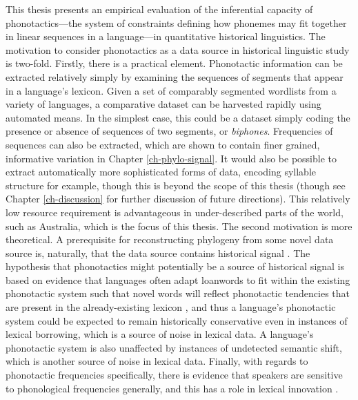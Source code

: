This thesis presents an empirical evaluation of the inferential capacity of phonotactics---the system of constraints defining how phonemes may fit together in linear sequences in a language---in quantitative historical linguistics. The motivation to consider phonotactics as a data source in historical linguistic study is two-fold. Firstly, there is a practical element. Phonotactic information can be extracted relatively simply by examining the sequences of segments that appear in a language's lexicon. Given a set of comparably segmented wordlists from a variety of languages, a comparative dataset can be harvested rapidly using automated means. In the simplest case, this could be a dataset simply coding the presence or absence of sequences of two segments, or \emph{biphones}. Frequencies of sequences can also be extracted, which are shown to contain finer grained, informative variation in Chapter \ref{ch-phylo-signal}. It would also be possible to extract automatically more sophisticated forms of data, encoding syllable structure for example, though this is beyond the scope of this thesis (though see Chapter \ref{ch-discussion} for further discussion of future directions). This relatively low resource requirement is advantageous in under-described parts of the world, such as Australia, which is the focus of this thesis. The second motivation is more theoretical. A prerequisite for reconstructing phylogeny from some novel data source is, naturally, that the data source contains historical signal \autocite{dunn_language_2015}. The hypothesis that phonotactics might potentially be a source of historical signal is based on evidence that languages often adapt loanwords to fit within the existing phonotactic system such that novel words will reflect phonotactic tendencies that are present in the already-existing lexicon \autocites{hyman_role_1970}{silverman_multiple_1992}{crawford_adaptation_2009}{kang_loanword_2011}, and thus a language's phonotactic system could be expected to remain historically conservative even in instances of lexical borrowing, which is a source of noise in lexical data. A language's phonotactic system is also unaffected by instances of undetected semantic shift, which is another source of noise in lexical data. Finally, with regards to phonotactic frequencies specifically, there is evidence that speakers are sensitive to phonological frequencies generally, and this has a role in lexical innovation \autocites{coleman_stochastic_1997}{albright_rules_2003}{hayes_stochastic_2006}[see also][pp.~20--21]{gordon_phonological_2016}.

